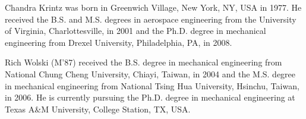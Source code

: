 \documentclass{ieeeaccess}
\begin{document}
\begin{IEEEbiography}{Chandra Krintz} was born in Greenwich Village, New York, NY, USA in 
1977. He received the B.S. and M.S. degrees in aerospace engineering from 
the University of Virginia, Charlottesville, in 2001 and the Ph.D. degree in 
mechanical engineering from Drexel University, Philadelphia, PA, in 2008.

\end{IEEEbiography}

\begin{IEEEbiography}{Rich Wolski} (M'87) received the B.S. degree in mechanical 
engineering from National Chung Cheng University, Chiayi, Taiwan, in 2004 
and the M.S. degree in mechanical engineering from National Tsing Hua 
University, Hsinchu, Taiwan, in 2006. He is currently pursuing the Ph.D. 
degree in mechanical engineering at Texas A{\&}M University, College 
Station, TX, USA.

\end{IEEEbiography}


\EOD
\end{document}
